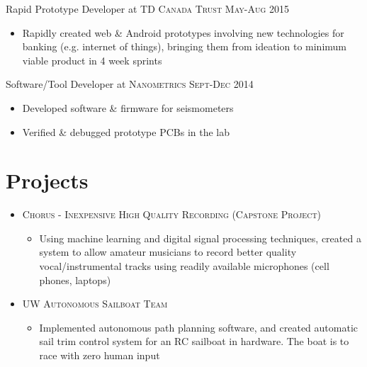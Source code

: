 \documentclass[a4paper,10pt]{article}
\begin{document}
\begin{minipage}[t]{0.66\textwidth}
Rapid Prototype Developer at \textsc{TD Canada Trust}  \textsc{May-Aug 2015}
\begin{itemize}
    \item {\footnotesize{Rapidly created web \& Android prototypes involving new technologies for banking (e.g. internet of things), bringing them from ideation to minimum viable product in 4 week sprints}}
\end{itemize}


Software/Tool Developer at \textsc{Nanometrics}  \textsc{Sept-Dec 2014}
\begin{itemize}
    \item {\footnotesize{Developed software \& firmware for seismometers}}
    \item {\footnotesize{Verified \& debugged prototype PCBs in the lab}}
\end{itemize}

\section{Projects}
\begin{itemize}
	\item {\textsc{Chorus - Inexpensive High Quality Recording (Capstone Project)}}
	\begin{itemize}
		\item {Using machine learning and digital signal processing techniques, created a system to allow amateur musicians to record better quality vocal/instrumental tracks using readily available microphones (cell phones, laptops)}
	\end{itemize}

	\item {\textsc{UW Autonomous Sailboat Team}}
	\begin{itemize}
		\item {Implemented autonomous path planning software, and created automatic sail trim control system for an RC sailboat in hardware. The boat is to race with zero human input}
	\end{itemize}
\end{itemize}


\end{minipage}
\hfill
\end{document}
